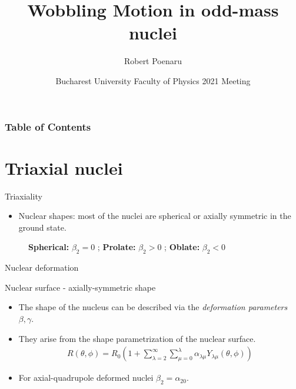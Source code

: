 \documentclass{beamer}
\title[Wobbling Motion in Odd-Mass Nuclei] %
{Wobbling Motion in odd-mass nuclei}
\author[R. Poenaru] %
{Robert Poenaru\inst{1,2}}
\institute[DFT @ IFIN-HH] %
{
  \inst{1}%
  Department of Theoretical Physics\newline
  IFIN-HH
  \and
  \inst{2}%
  Faculty of Physics\newline
  University of Bucharest
}
\date[\today] %
{Bucharest University Faculty of Physics 2021 Meeting}
\begin{document}
\maketitle
\begin{frame}
\frametitle{Table of Contents}
\tableofcontents
\end{frame}

\section{Triaxial nuclei}

\begin{frame}{Triaxiality}
\begin{itemize}
    \item Nuclear shapes: most of the nuclei are spherical or axially symmetric in the ground state.
\end{itemize}
  \begin{figure}
    \centering
    \caption{\textbf{Spherical:} $\beta_2=0$ ; \textbf{Prolate:} $\beta_2>0$ ; \textbf{Oblate:} $\beta_2<0$}
  \end{figure}
\end{frame}

\begin{frame}{Nuclear deformation}
    \begin{block}{Nuclear surface - axially-symmetric shape}
    \begin{itemize}
    \item The shape of the nucleus can be described via the \textit{deformation parameters} $\beta,\gamma$. 
    \item They arise from the shape parametrization of the nuclear surface.
    \begin{align}
        R(\theta,\phi)=R_0\left(1+\sum_{\lambda=2}^{\infty}\sum_{\mu=0}^{\lambda}\alpha_{\lambda\mu}Y_{\lambda\mu}(\theta,\phi)\right)
    \end{align}
    \item For axial-quadrupole deformed nuclei $\beta_2=\alpha_{20}$.
    \end{itemize}
    \end{block}
\end{frame}
\end{document}
